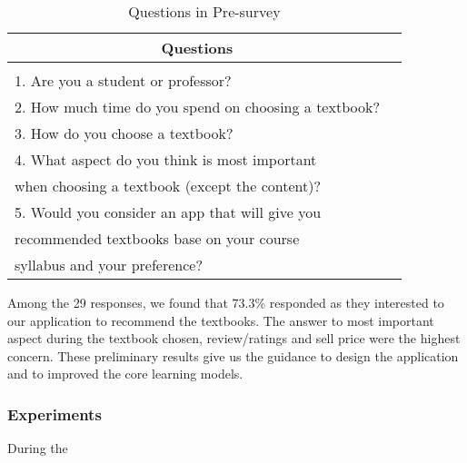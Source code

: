 \begin{table}[ht]
\caption{Questions in Pre-survey}
\label{Pre-survey}
\begin{center}
\begin{tabular}{ll}
\multicolumn{1}{c}{\bf Questions} 
\\ \hline \\
1. Are you a student or professor?\\
2. How much time do you spend on choosing a textbook?\\
3. How do you choose a textbook?\\
4. What aspect do you think is most important\\
when choosing a textbook (except the content)? \\
5. Would you consider an app that will give you \\
recommended textbooks base on your course \\
syllabus and your preference? \\
\end{tabular}
\end{center}
\end{table}
Among the 29 responses, we found that 73.3\% responded as they interested to our application to recommend the textbooks. The answer to most important aspect during the textbook chosen, review/ratings and sell price were the highest concern. These preliminary results give us the guidance to design the application and to improved the core learning models.
\subsubsection{Experiments}
During the 

